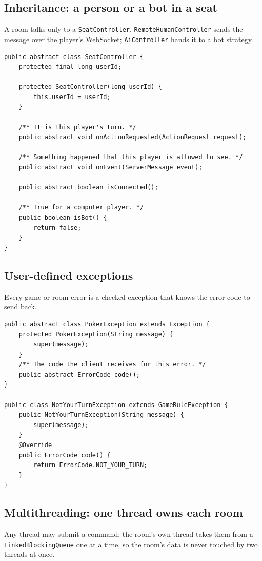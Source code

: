 \documentclass[12pt,a4paper]{article}
\newcommand{\cls}[1]{\texttt{#1}}
\begin{document}
\subsection{Inheritance: a person or a bot in a seat}
A room talks only to a \cls{SeatController}. \cls{RemoteHumanController} sends the message
over the player's WebSocket; \cls{AiController} hands it to a bot strategy.

\begin{lstlisting}[caption={\cls{SeatController} (poker-server, \cls{server.player}).}]
public abstract class SeatController {
    protected final long userId;

    protected SeatController(long userId) {
        this.userId = userId;
    }

    /** It is this player's turn. */
    public abstract void onActionRequested(ActionRequest request);

    /** Something happened that this player is allowed to see. */
    public abstract void onEvent(ServerMessage event);

    public abstract boolean isConnected();

    /** True for a computer player. */
    public boolean isBot() {
        return false;
    }
}
\end{lstlisting}

\subsection{User-defined exceptions}
Every game or room error is a checked exception that knows the error code to send back.

\begin{lstlisting}[caption={\cls{PokerException} and one subclass (poker-common).}]
public abstract class PokerException extends Exception {
    protected PokerException(String message) {
        super(message);
    }
    /** The code the client receives for this error. */
    public abstract ErrorCode code();
}

public class NotYourTurnException extends GameRuleException {
    public NotYourTurnException(String message) {
        super(message);
    }
    @Override
    public ErrorCode code() {
        return ErrorCode.NOT_YOUR_TURN;
    }
}
\end{lstlisting}

\subsection{Multithreading: one thread owns each room}
Any thread may submit a command; the room's own thread takes them from a
\cls{LinkedBlockingQueue} one at a time, so the room's data is never touched by two threads at
once.
\end{document}
